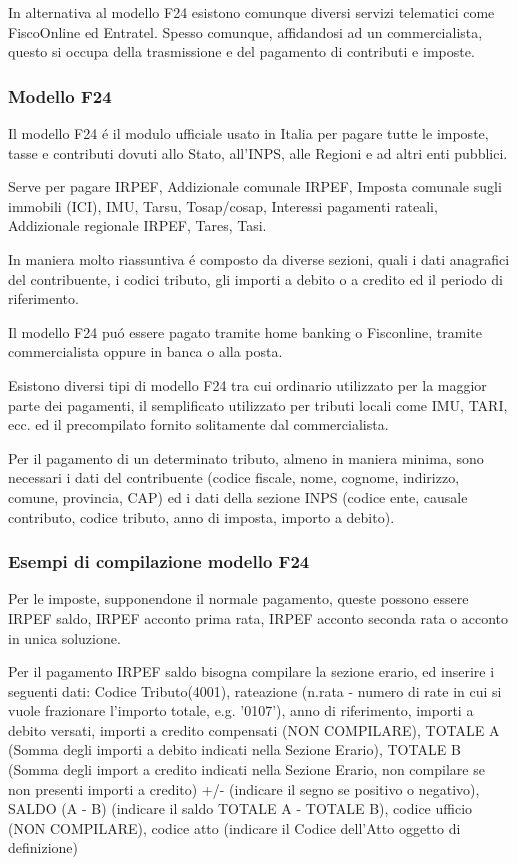 \documentclass{article}
\begin{document}
In alternativa al modello F24 esistono comunque diversi servizi telematici come FiscoOnline ed Entratel. Spesso comunque, affidandosi ad un commercialista, questo si occupa della trasmissione e del pagamento di contributi e imposte.

\subsubsection{Modello F24}
Il modello F24 \'e il modulo ufficiale usato in Italia per pagare tutte le imposte, tasse e contributi dovuti allo Stato, all'INPS, alle Regioni e ad altri enti pubblici.

Serve per pagare IRPEF, Addizionale comunale IRPEF, Imposta comunale sugli immobili (ICI), IMU, Tarsu, Tosap/cosap, Interessi pagamenti rateali, Addizionale regionale IRPEF, Tares, Tasi.

In maniera molto riassuntiva \'e composto da diverse sezioni, quali i dati anagrafici del contribuente, i codici tributo, gli importi a debito o a credito ed il periodo di riferimento.

Il modello F24 pu\'o essere pagato tramite home banking o Fisconline, tramite commercialista oppure in banca o alla posta.

Esistono diversi tipi di modello F24 tra cui ordinario utilizzato per la maggior parte dei pagamenti, il semplificato utilizzato per tributi locali come IMU, TARI, ecc. ed il precompilato fornito solitamente dal commercialista.

Per il pagamento di un determinato tributo, almeno in maniera minima, sono necessari i dati del contribuente (codice fiscale, nome, cognome, indirizzo, comune, provincia, CAP) 
ed i dati della sezione INPS (codice ente, causale contributo, codice tributo, anno di imposta, importo a debito).   

\subsubsection{Esempi di compilazione modello F24}
Per le imposte, supponendone il normale pagamento,
queste possono essere IRPEF saldo, IRPEF acconto prima rata, IRPEF acconto seconda rata o acconto in unica soluzione.

Per il pagamento IRPEF saldo bisogna compilare la sezione erario, ed inserire i seguenti dati: 
Codice Tributo(4001), 
rateazione (n.rata - numero di rate in cui si vuole frazionare l'importo totale, e.g. '0107'), 
anno di riferimento, 
importi a debito versati, 
importi a credito compensati (NON COMPILARE),
TOTALE A (Somma degli importi a debito indicati nella Sezione Erario),
TOTALE B (Somma degli import a credito indicati nella Sezione Erario, non compilare se non presenti importi a credito)
+/- (indicare il segno se positivo o negativo),
SALDO (A - B) (indicare il saldo TOTALE A - TOTALE B),
codice ufficio (NON COMPILARE),
codice atto (indicare il Codice dell'Atto oggetto di definizione)
\end{document}
